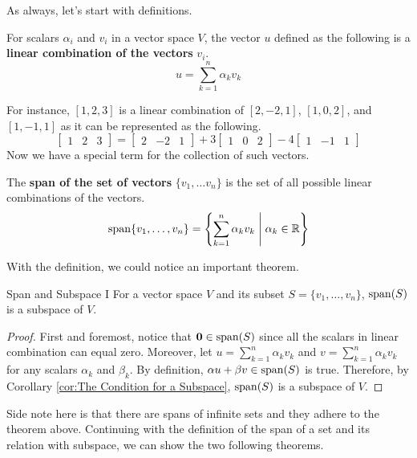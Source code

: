 \documentclass[../../main.tex]{subfiles}
\begin{document}
As always, let's start with definitions.

\begin{definition}{}{}
For scalars $\alpha_i$ and $v_i$ in a vector space $V$, the vector
$u$ defined as the following is a \textbf{linear combination of the
vectors} $v_i$.
\[
u = \sum_{k = 1}^n \alpha_k v_k
\]
\end{definition}

For instance, $[1, 2, 3]$ is a linear combination of $[2, -2, 1]$,
$[1, 0, 2]$, and $[1, -1, 1]$ as it can be represented as the
following.
\[
\begin{bmatrix}
    1 & 2 & 3
\end{bmatrix}
=
\begin{bmatrix}
    2 & -2 & 1
\end{bmatrix}
+
3\begin{bmatrix}
    1 & 0 & 2
\end{bmatrix}
-
4\begin{bmatrix}
    1 & -1 & 1
\end{bmatrix}
\]
Now we have a special term for the collection of such vectors.

\begin{definition}{}{}
The \textbf{span of the set of vectors} $\{ v_1, \ldots v_n \}$ is
the set of all possible linear combinations of the vectors.
\[
\operatorname{span}\{v_1, \ldots, v_n\}
= \left\{
    \sum_{k = 1}^n \alpha_k v_k \; \middle|\; \alpha_k \in \mathbb{R}
\right\}
\]
\end{definition}

With the definition, we could notice an important theorem.

\begin{theorem}{}{Span and Subspace I}
For a vector space $V$ and its subset $S = \{ v_1, \ldots, v_n \}$,
$\operatorname{span}(S)$ is a subspace of $V$.
\end{theorem}
\begin{proof}
First and foremost, notice that $\mathbf{0} \in \operatorname{span}(S)$ since all
the scalars in linear combination can equal zero. Moreover, let $u =
\sum_{k = 1}^n \alpha_k v_k$ and $v = \sum_{k = 1}^n \alpha_k v_k$ for
any scalars $\alpha_k$ and $\beta_k$. By definition, $\alpha u +
\beta v \in \operatorname{span}(S)$ is true. Therefore, by Corollary
\ref{cor:The Condition for a Subspace}, $\operatorname{span}(S)$ is a subspace of
$V$.
\end{proof}

Side note here is that there are spans of infinite sets and they
adhere to the theorem above. Continuing with the definition of the
span of a set and its relation with subspace, we can show the two
following theorems.
\end{document}
